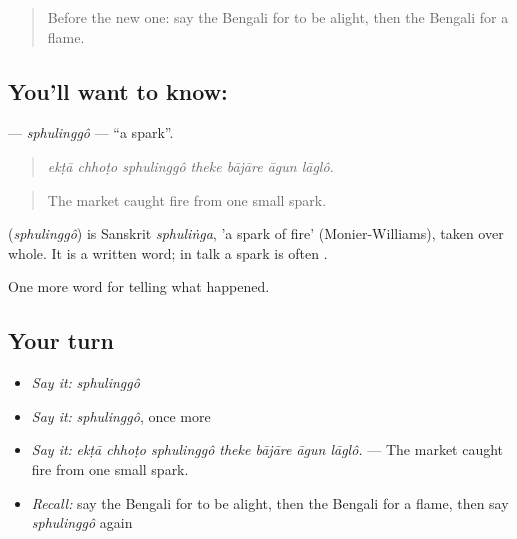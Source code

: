 \begin{quote}
Before the new one: say the Bengali for to be alight, then the Bengali for a flame.
\end{quote}

\subsection*{You'll want to know: }
\textbf{} — \emph{sphulinggô} — \textquotedblleft{}a spark\textquotedblright{}.

\begin{quote}
      
\end{quote}

\begin{quote}
\emph{ekṭā chhoṭo sphulinggô theke bājāre āgun lāglô.}
\end{quote}

\begin{quote}
The market caught fire from one small spark.
\end{quote}

\begin{cousinweb}
\textbf{} (\emph{sphulinggô}) is Sanskrit \emph{sphuliṅga}, 'a spark of fire' (Monier-Williams), taken over whole. It is a written word; in talk a spark is often .
\end{cousinweb}

\begin{grammarlens}[title={What you've built}]
One more word for telling what happened.
\end{grammarlens}

\subsection*{Your turn}
\begin{itemize}
\raggedright
  \item \emph{Say it:} \emph{sphulinggô}
  \item \emph{Say it:} \emph{sphulinggô}, once more
  \item \emph{Say it:} \emph{ekṭā chhoṭo sphulinggô theke bājāre āgun lāglô.} — The market caught fire from one small spark.
  \item \emph{Recall:} say the Bengali for to be alight, then the Bengali for a flame, then say \emph{sphulinggô} again
\end{itemize}

